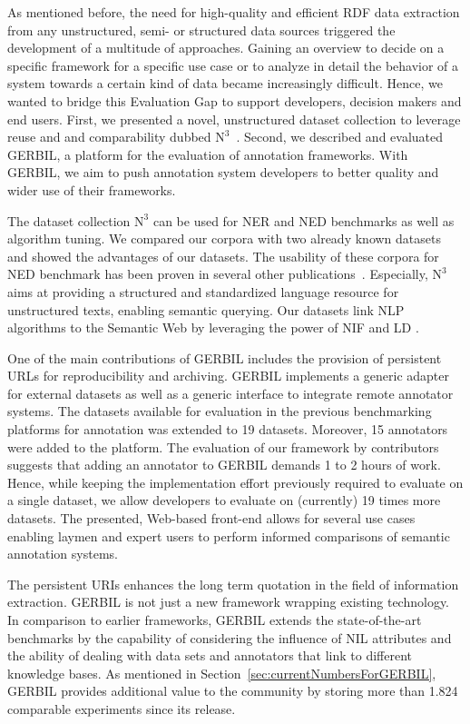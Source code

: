 As mentioned before, the need for high-quality and efficient RDF data extraction from any unstructured, semi- or structured data sources triggered the development of a multitude of approaches. 
Gaining an overview to decide on a specific framework for a specific use case or to analyze in detail the behavior of  a system towards a certain kind of data became increasingly difficult.
Hence, we wanted to bridge this Evaluation Gap to  support developers, decision makers and end users.
First, we presented a novel, unstructured dataset collection to leverage reuse and and comparability dubbed $\mbox{N}^3$~\cite{n3}. 
Second, we described and evaluated GERBIL, a platform for the evaluation of annotation frameworks. With GERBIL, we aim to push annotation system developers to better quality and wider use of their frameworks.

The dataset collection $\mbox{N}^3$ can be used for \ac{NER}  and \ac{NED}  benchmarks as well as algorithm tuning.
We compared our corpora with two already known datasets and showed the advantages of our datasets.
The usability of these corpora for \ac{NED}  benchmark has been proven in several other publications~\cite{agdistis_iswc,GER+13,GERBIL}.
Especially, $\mbox{N}^3$ aims at providing a structured and standardized language resource for unstructured texts, enabling semantic querying.
Our datasets link \ac{NLP}  algorithms to the Semantic Web by leveraging the power of NIF and \ac{LD} .

One of the main contributions of GERBIL includes the provision of persistent URLs for reproducibility and archiving.
GERBIL implements a generic adapter for external datasets as well as a generic interface to integrate remote annotator systems.
The datasets available for evaluation in the previous benchmarking platforms for annotation was extended to 19 datasets. 
Moreover, 15 annotators were added to the platform. 
The evaluation of our framework by contributors suggests that adding an annotator to GERBIL demands 1 to 2 hours of work. 
Hence, while keeping the implementation effort previously required to evaluate on a single dataset, we allow developers to evaluate on (currently) 19 times more datasets.
The presented, Web-based front-end allows for several use cases enabling laymen and expert users to perform informed  comparisons of semantic annotation systems.

The persistent URIs enhances the long term quotation in the field of information extraction.
GERBIL is not just a new framework wrapping existing technology. 
In comparison to earlier frameworks, GERBIL extends the state-of-the-art benchmarks by the capability of considering the influence of NIL attributes and the ability of dealing with data sets and annotators that link to different knowledge bases.
As mentioned in Section~\ref{sec:currentNumbersForGERBIL}, GERBIL provides additional value to the community by storing more than 1.824 comparable experiments since its release. 

